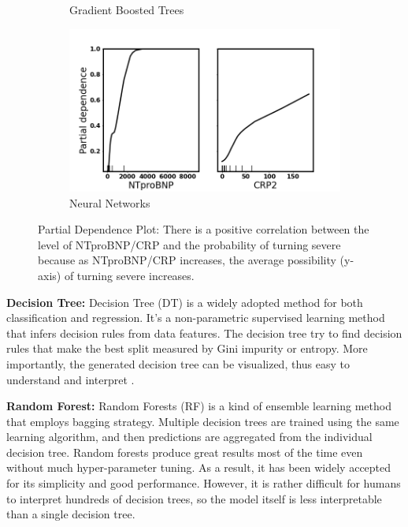 \begin{figure}
\begin{subfigure}[b]{0.475\textwidth}
    \caption{Gradient Boosted Trees}
    \label{fig:gbt_pdp}
\end{subfigure}
\begin{subfigure}[b]{0.475\textwidth}
    \centering
    \includegraphics[width=\textwidth]{figures/chapter_interp/nn_pdp_crp_ntproBNP.png}
    \caption{Neural Networks}
    \label{fig:nn_pdp}
\end{subfigure}
\caption{Partial Dependence Plot: There is a positive correlation between the level of NTproBNP/CRP and the probability of turning severe because as NTproBNP/CRP increases, the average possibility (y-axis) of turning severe increases.}
\label{fig.pdp}
\end{figure}

\textbf{Decision Tree:} Decision Tree (DT) is a widely adopted method for both classification and regression. It's a non-parametric supervised learning method that infers decision rules from data features. The decision tree try to find decision rules that make the best split measured by Gini impurity or entropy. More importantly, the generated decision tree can be visualized, thus easy to understand and interpret \citep{Breiman2015Classification}.

\textbf{Random Forest:} Random Forests (RF) is a kind of ensemble learning method \citep{Breiman2001Random} that employs bagging strategy. Multiple decision trees are trained using the same learning algorithm, and then predictions are aggregated from the individual decision tree. Random forests produce great results most of the time even without much hyper-parameter tuning. As a result, it has been widely accepted for its simplicity and good performance. However, it is rather difficult for humans to interpret hundreds of decision trees, so the model itself is less interpretable than a single decision tree.

